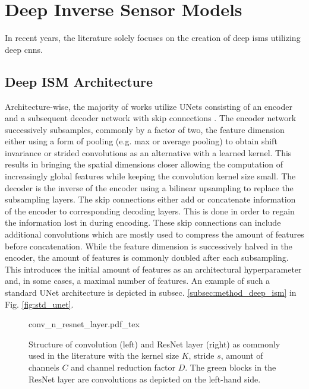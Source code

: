 \section{Deep Inverse Sensor Models}
\label{sec:deep_isms}
In recent years, the literature solely focuses on the creation of deep \gls{ism}s utilizing deep \gls{cnn}s. 
%
\subsection{Deep ISM Architecture}
\label{subsec:architecture}
Architecture-wise, the majority of works utilize UNets \cite{ronneberger2015u} consisting of an encoder and a subsequent decoder network with skip connections \cite{prophet2019semantic,sless2019road,wirges2018evidential,weston2019probably,schulter2018learning,lu2019monocular,mani2020monolayout}. The encoder network successively subsamples, commonly by a factor of two, the feature dimension either using a form of pooling (e.g. max or average pooling) to obtain shift invariance or strided convolutions as an alternative with a learned kernel. This results in bringing the spatial dimensions closer allowing the computation of increasingly global features while keeping the convolution kernel size small. The decoder is the inverse of the encoder using a bilinear upsampling \cite{odena2016deconvolution} to replace the subsampling layers. The skip connections either add or concatenate information of the encoder to corresponding decoding layers. This is done in order to regain the information lost in during encoding. These skip connections can include additional convolutions which are mostly used to compress the amount of features before concatenation. While the feature dimension is successively halved in the encoder, the amount of features is commonly doubled after each subsampling. This introduces the initial amount of features as an architectural hyperparameter and, in some cases, a maximal number of features. An example of such a standard UNet architecture is depicted in subsec. \ref{subsec:method_deep_ism} in Fig. \ref{fig:std_unet}.
\\
\begin{figure}
	\begin{center}
		{conv_n_resnet_layer.pdf_tex}
		\caption{\label{fig:conv_n_resnet_layer}Structure of convolution (left) and ResNet layer (right) as commonly used in the literature with the kernel size $K$, stride $s$, amount of channels $C$ and channel reduction factor $D$. The green blocks in the ResNet layer are convolutions as depicted on the left-hand side.}
	\end{center}
\end{figure} 
